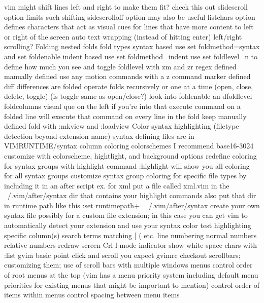 \documentclass[12pt]{book}
\begin{document}
{    vim might shift lines left and right to make them fit? check this out
    slidescroll option limits such shifting
    sidescrolloff option may also be useful
    listchars option defines characters that act as visual cues for lines that have more content to left or right of the screen
    auto text wrapping (instead of hitting enter)
  left/right scrolling?
  Folding
    nested folds
    fold types
      syntax based
        use set foldmethod=syntax and set foldenable
      indent based
        use set foldmethod=indent
        use set foldlevel=n to define how much you see and toggle foldlevel with zm and zr
      regex defined
      manually defined
        use any motion commands with a z command
      marker defined
      diff differences are folded
    operate folds recursively or one at a time (open, close, delete, toggle) (is toggle same as open/close?)
    look into foldenable an dfoldlevel
    foldcolumns visual que on the left if you're into that
    execute command on a folded line will execute that command on every line in the fold
    keep manually defined fold with :mkview and :loadview
  Color
    syntax highlighting (filetype detection beyond extension name)
      syntax defining files are in VIMRUNTIME/syntax
    column coloring
    colorschemes
      I recommend base16-3024
      customize with colorscheme, hightlight, and background options
      redefine coloring for syntax groups with highlight command
      :highlight will show you all coloring for all syntax groups
      customize syntax group coloring for specific file types by including it in an after script
        ex. for xml put a file called xml.vim in the ~/.vim/after/syntax dir that contains your highlight commands
        also put that dir in runtime path like this :set runtimepath+=~/.vim/after/syntax
      create your own syntax file
        possibly for a custom file extension; in this case you can get vim to automatically detect your extension and use your syntax
    color test
  highlighting
    specific column(s)
    search terms
    matching { [ ( etc.
  line numbering
    normal numbers
    relative numbers
  redraw screen Crl-l
  mode indicator
  show white space chars with :list
  gvim
    basic point click and scroll you expect
    gvimrc
    checkout scrollbars; customizing them; use of scroll bars with multiple windows
    menus
      control order of root menus at the top (vim has a menu priority system including default menu priorities for existing menus that might be important to mention)
      control order of items within menus
      control spacing between menu items
}}
\end{document}

